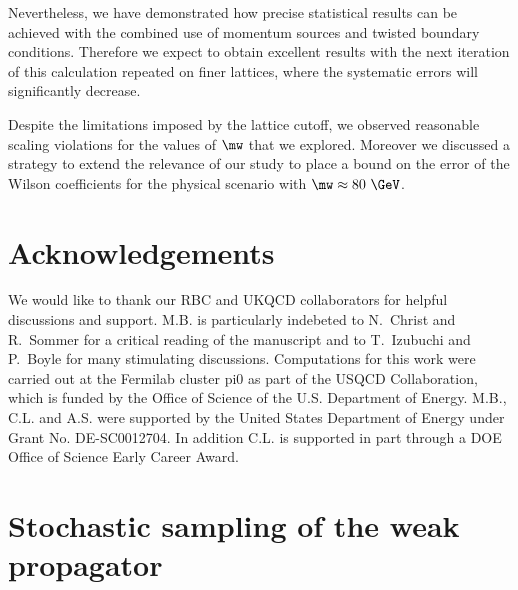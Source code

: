 \documentclass[aps,prd,twocolumn,nofootinbib,showpacs,superscriptaddress]{revtex4-1}
\begin{document}
Nevertheless, we have demonstrated how precise statistical results can be achieved
with the combined use of momentum sources and twisted boundary conditions. Therefore
we expect to obtain excellent results with the next iteration of this calculation repeated
on finer lattices, where the systematic errors will significantly decrease.

Despite the limitations imposed by the lattice cutoff, we observed reasonable scaling
violations for the values of $\mw$ that we explored. Moreover we discussed 
a strategy to extend the relevance of our study to place a bound on the error
of the Wilson coefficients for the physical scenario with $\mw \approx 80 ~\GeV$.

\section{Acknowledgements}

We would like to thank our RBC and UKQCD collaborators for helpful discussions and support.
M.B. is particularly indebeted to N.~Christ and R.~Sommer 
for a critical reading of the manuscript
and to T.~Izubuchi and P.~Boyle for many stimulating discussions.
Computations for this work were carried out at the Fermilab cluster pi0 
as part of the USQCD Collaboration,
which is funded by the Office of Science of the U.S.
Department of Energy.
M.B., C.L. and A.S. were supported by the United States 
Department of Energy under Grant No. DE-SC0012704.
In addition C.L. is supported in part 
through a DOE Office of Science Early Career Award.


\appendix
\section{Stochastic sampling of the weak propagator} 
\label{app:point-source}
\end{document}
